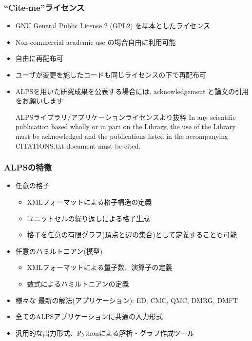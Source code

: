 \begin{frame}[t,fragile]
\frametitle{``Cite-me''ライセンス}
  \begin{itemize}
  \item GNU General Public License 2 (GPL2) を基本としたライセンス
  \item Non-commercial academic use の場合自由に利用可能
  \item 自由に再配布可
  \item ユーザが変更を施したコードも同じライセンスの下で再配布可
  \item ALPSを用いた研究成果を公表する場合には, acknowledgement と論文の引用をお願いします
    \begin{minipage}{.9\textwidth}
    \begin{block}{ALPSライブラリ/アプリケーションライセンスより抜粋}
      In any scientific publication based wholly or in part on the
      Library, the use of the Library must be acknowledged and the
      publications listed in the accompanying CITATIONS.txt document
      must be cited.
    \end{block}
    \end{minipage}
  \end{itemize}
\end{frame}

\begin{frame}[t,fragile]
  \frametitle{ALPSの特徴}
  \begin{itemize}
  \item {\color{red} 任意の}格子
    \begin{itemize}
    \item XMLフォーマットによる格子構造の定義
    \item ユニットセルの繰り返しによる格子生成
    \item 格子を任意の有限グラフ(頂点と辺の集合)として定義することも可能
    \end{itemize}
  \item {\color{red} 任意の}ハミルトニアン(模型)
    \begin{itemize}
    \item XMLフォーマットによる量子数、演算子の定義
    \item 数式によるハミルトニアンの定義
    \end{itemize}
  \item 様々な{\color{red} 最新の}解法(アプリケーション): ED, CMC, QMC, DMRG, DMFT
  \item {\color{red} 全ての}ALPSアプリケーションに共通の入力形式
  \item {\color{red} 汎用的な}出力形式、Pythonによる解析・グラフ作成ツール
  \end{itemize}
\end{frame}

